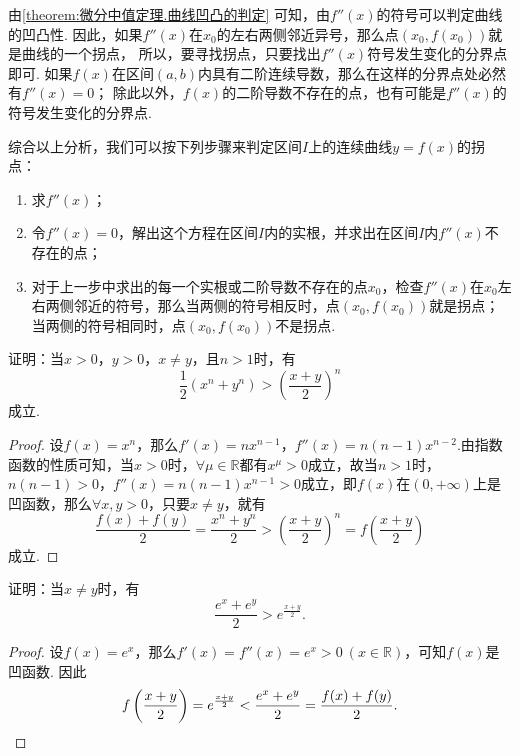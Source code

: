 由\cref{theorem:微分中值定理.曲线凹凸的判定} 可知，由\(f''(x)\)的符号可以判定曲线的凹凸性.
因此，如果\(f''(x)\)在\(x_0\)的左右两侧邻近异号，那么点\((x_0,f(x_0))\)就是曲线的一个拐点，
所以，要寻找拐点，只要找出\(f''(x)\)符号发生变化的分界点即可.
如果\(f(x)\)在区间\((a,b)\)内具有二阶连续导数，那么在这样的分界点处必然有\(f''(x)=0\)；
除此以外，\(f(x)\)的二阶导数不存在的点，也有可能是\(f''(x)\)的符号发生变化的分界点.

{\color{red}综合以上分析，我们可以按下列步骤来判定区间\(I\)上的连续曲线\(y=f(x)\)的拐点：\begin{enumerate}
\item 求\(f''(x)\)；
\item 令\(f''(x) = 0\)，解出这个方程在区间\(I\)内的实根，并求出在区间\(I\)内\(f''(x)\)不存在的点；
\item 对于上一步中求出的每一个实根或二阶导数不存在的点\(x_0\)，检查\(f''(x)\)在\(x_0\)左右两侧邻近的符号，那么当两侧的符号相反时，点\((x_0,f(x_0))\)就是拐点；
当两侧的符号相同时，点\((x_0,f(x_0))\)不是拐点.
\end{enumerate}}

\begin{example}
证明：当\(x>0\)，\(y>0\)，\(x \neq y\)，且\(n>1\)时，有\begin{equation}\label{equation:微分中值定理.平均数的比较1}
\frac{1}{2} (x^n+y^n) > \left(\frac{x+y}{2}\right)^n
\end{equation}成立.
\begin{proof}
设\(f(x) = x^n\)，那么\(f'(x) = n x^{n-1}\)，\(f''(x) = n(n-1) x^{n-2}\).由指数函数的性质可知，当\(x > 0\)时，\(\forall \mu \in \mathbb{R}\)都有\(x^{\mu} > 0\)成立，故当\(n > 1\)时，\(n(n-1)>0\)，\(f''(x) = n(n-1) x^{n-1} > 0\)成立，即\(f(x)\)在\((0,+\infty)\)上是凹函数，那么\(\forall x,y>0\)，只要\(x \neq y\)，就有\[
\frac{f(x)+f(y)}{2} = \frac{x^n+y^n}{2} > \left(\frac{x+y}{2}\right)^n = f\left(\frac{x+y}{2}\right)
\]成立.
\end{proof}
\end{example}

\begin{example}
证明：当\(x \neq y\)时，有\begin{equation}
\frac{e^x + e^y}{2} > e^{\frac{x+y}{2}}.
\end{equation}
\begin{proof}
设\(f(x) = e^x\)，那么\(f'(x) = f''(x) = e^x > 0\ (x\in\mathbb{R})\)，可知\(f(x)\)是凹函数.
因此\[
f\left(\frac{x+y}{2}\right) = e^{\frac{x+y}{2}}
< \frac{e^x+e^y}{2} = \frac{f(x)+f(y)}{2}.
\qedhere
\]
\end{proof}
\end{example}

